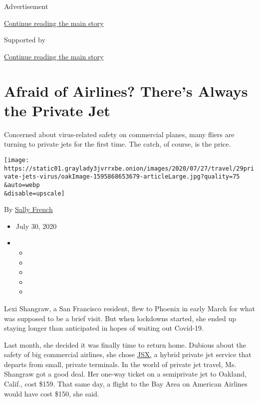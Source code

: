 Advertisement

\protect\hyperlink{after-top}{Continue reading the main story}

Supported by

\protect\hyperlink{after-sponsor}{Continue reading the main story}

\hypertarget{afraid-of-airlines-theres-always-the-private-jet}{%
\section{Afraid of Airlines? There's Always the Private
Jet}\label{afraid-of-airlines-theres-always-the-private-jet}}

Concerned about virus-related safety on commercial planes, many fliers
are turning to private jets for the first time. The catch, of course, is
the price.

\texttt{[image: https://static01.graylady3jvrrxbe.onion/images/2020/07/27/travel/29private-jets-virus/oakImage-1595868653679-articleLarge.jpg?quality=75\\\&auto=webp\\\&disable=upscale]}

By \href{https://www.nytimes3xbfgragh.onion/by/sally-french}{Sally
French}

\begin{itemize}
\item
  July 30, 2020
\item
  \begin{itemize}
  \item
  \item
  \item
  \item
  \item
  \end{itemize}
\end{itemize}

Lexi Shangraw, a San Francisco resident, flew to Phoenix in early March
for what was supposed to be a brief visit. But when lockdowns started,
she ended up staying longer than anticipated in hopes of waiting out
Covid-19.

Last month, she decided it was finally time to return home. Dubious
about the safety of big commercial airlines, she chose
\href{https://www.jsx.com/home/search}{JSX,} a hybrid private jet
service that departs from small, private terminals. In the world of
private jet travel, Ms. Shangraw got a good deal. Her one-way ticket on
a semiprivate jet to Oakland, Calif., cost \$159. That same day, a
flight to the Bay Area on American Airlines would have cost \$150, she
said.

